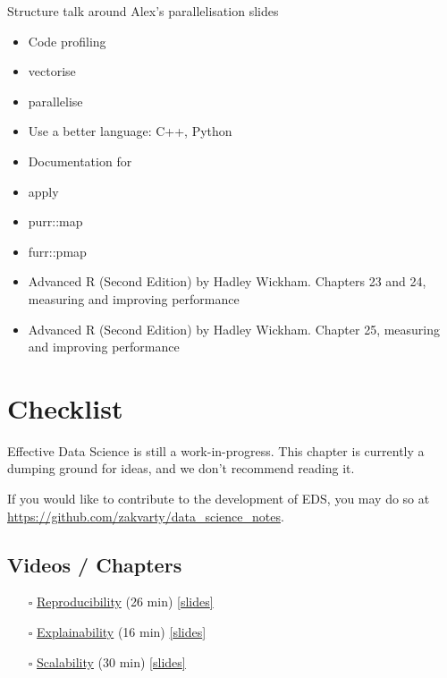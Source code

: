 \documentclass[
  12pt,
]{book}
\begin{document}
Structure talk around Alex's parallelisation slides

\begin{itemize}
\item
  Code profiling
\item
  vectorise
\item
  parallelise
\item
  Use a better language: C++, Python
\item
  Documentation for
\item
  apply
\item
  purr::map
\item
  furr::pmap
\item
  Advanced R (Second Edition) by Hadley Wickham. Chapters 23 and 24, measuring and improving performance
\item
  Advanced R (Second Edition) by Hadley Wickham. Chapter 25, measuring and improving performance
\end{itemize}

\hypertarget{production-checklist}{%
\chapter*{Checklist}\label{production-checklist}}

Effective Data Science is still a work-in-progress. This chapter is currently a dumping ground for ideas, and we don't recommend reading it.

If you would like to contribute to the development of EDS, you may do so at \url{https://github.com/zakvarty/data_science_notes}.

\hypertarget{videos-chapters-3}{%
\section{Videos / Chapters}\label{videos-chapters-3}}

\begin{itemize}
\item[$\square$]
  \href{https://imperial.cloud.panopto.eu/Panopto/Pages/Viewer.aspx?id=f48d43b4-b370-4cfb-a438-af9e00bf79b5}{Reproducibility} (26 min) \href{https://github.com/zakvarty/effective-data-science-slides-2022/raw/main/04-01-reproducibility/04-01-reproducibility.pdf}{{[}slides{]}}
\item[$\square$]
  \href{https://imperial.cloud.panopto.eu/Panopto/Pages/Viewer.aspx?id=f2c64757-faea-470f-9dfc-af9e00ba4929}{Explainability} (16 min) \href{https://github.com/zakvarty/effective-data-science-slides-2022/raw/main/04-02-explainability/04-02-explainability.pdf}{{[}slides{]}}
\item[$\square$]
  \href{https://imperial.cloud.panopto.eu/Panopto/Pages/Viewer.aspx?id=5305fbb1-8dc9-4232-82d0-afa00187f942}{Scalability} (30 min) \href{https://github.com/zakvarty/effective-data-science-slides-2022/raw/main/04-03-scalability/04-03-scalability.pdf}{{[}slides{]}}
\end{itemize}
\end{document}
